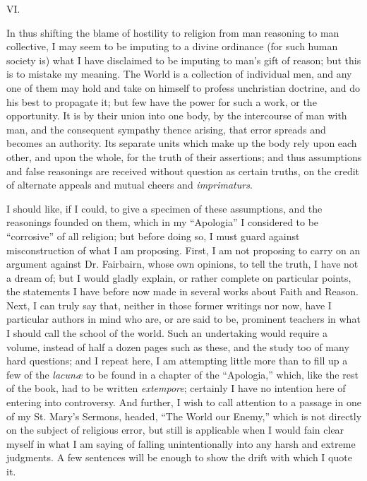 VI.

In thus shifting the blame of hostility to religion from man
reasoning to man collective, I may seem to be imputing to a divine
ordinance (for such human society is) what I have disclaimed to be
imputing to man's gift of reason; but this is to mistake my meaning.
The World is a collection of individual men, and any one of them may
hold and take on himself to profess unchristian doctrine, and do his
best to propagate it; but few have the power for such a work, or the
opportunity. It is by their union into one body, by the intercourse of
man with man, and the consequent sympathy thence arising, that error
spreads and becomes an authority. Its separate units which make up the
body rely upon each other, and upon the whole, for the truth of their
assertions; and thus assumptions and false reasonings are received
without question as certain truths, on the credit of alternate appeals
and mutual cheers and \emph{imprimaturs}.

I should like, if I could, to give a specimen of these assumptions,
and the reasonings founded on them, which in my ``Apologia'' I
considered to be ``corrosive'' of all religion; but before
doing so, I must guard against misconstruction of what I am proposing.
First, I am not proposing to carry on an argument against Dr.
Fairbairn, whose own opinions, to tell the truth, I have not a dream
of; but I would gladly explain, or rather complete on particular
points, the statements I have before now made in several works about
Faith and Reason. Next, I can truly say that, neither in those former
writings nor now, have I particular authors in mind who are, or are
said to be, prominent teachers in what I should call the school of the
world. Such an undertaking would require a volume, instead of half a
dozen pages such as these, and the study too of many hard questions;
and I repeat here, I am attempting little more than to fill up a few
of the \emph{lacunæ} to be found in a chapter of the
``Apologia,'' which, like the rest of the book, had to be
written \emph{extempore}; certainly I have no intention here of
entering into controversy. And further, I wish to call attention to a
passage in one of my St. Mary's Sermons, headed, ``The World our
Enemy,'' which is not directly on the subject of religious error,
but still is applicable when I would fain clear myself in what I am
saying of falling unintentionally into any harsh and extreme
judgments. A few sentences will be enough to show the drift with which
I quote it.

